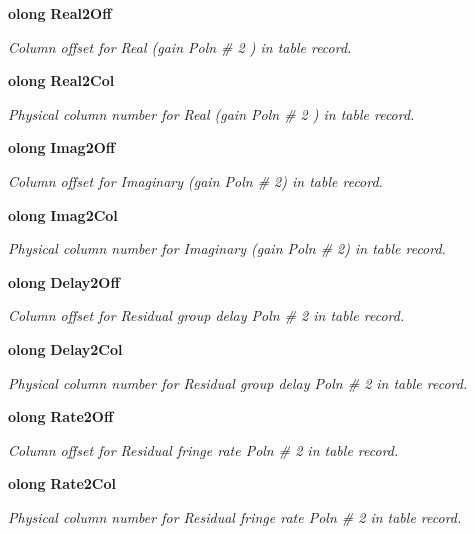 \begin{CompactItemize}
{\bf olong} {\bf Real2Off}
\begin{CompactList}\small\item\em Column offset for Real (gain Poln \# 2 ) in table record. \item\end{CompactList}\item 
{\bf olong} {\bf Real2Col}
\begin{CompactList}\small\item\em Physical column number for Real (gain Poln \# 2 ) in table record. \item\end{CompactList}\item 
{\bf olong} {\bf Imag2Off}
\begin{CompactList}\small\item\em Column offset for Imaginary (gain Poln \# 2) in table record. \item\end{CompactList}\item 
{\bf olong} {\bf Imag2Col}
\begin{CompactList}\small\item\em Physical column number for Imaginary (gain Poln \# 2) in table record. \item\end{CompactList}\item 
{\bf olong} {\bf Delay2Off}
\begin{CompactList}\small\item\em Column offset for Residual group delay Poln \# 2 in table record. \item\end{CompactList}\item 
{\bf olong} {\bf Delay2Col}
\begin{CompactList}\small\item\em Physical column number for Residual group delay Poln \# 2 in table record. \item\end{CompactList}\item 
{\bf olong} {\bf Rate2Off}
\begin{CompactList}\small\item\em Column offset for Residual fringe rate Poln \# 2 in table record. \item\end{CompactList}\item 
{\bf olong} {\bf Rate2Col}
\begin{CompactList}\small\item\em Physical column number for Residual fringe rate Poln \# 2 in table record. \item\end{CompactList}\item 

\end{CompactItemize}
